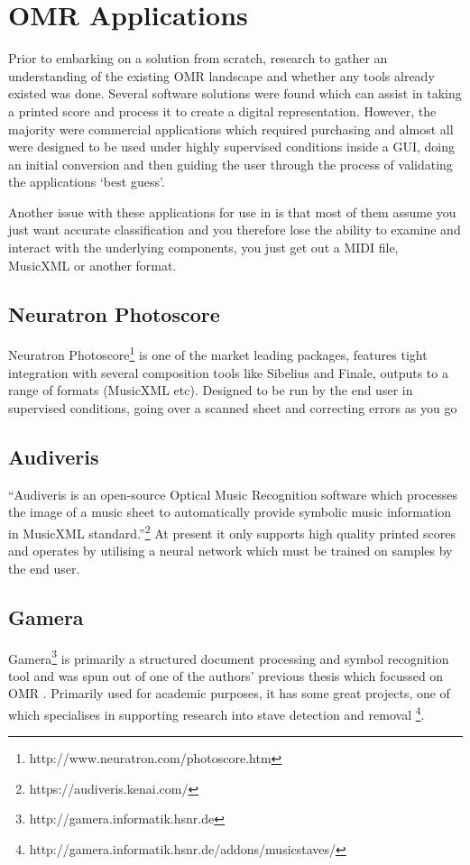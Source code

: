 \section{OMR Applications}

Prior to embarking on a solution from scratch, research to gather an understanding of the existing OMR landscape and whether any tools already existed was done. Several software solutions were found which can assist in taking a printed score and process it to create a digital representation. However, the majority were commercial applications which required purchasing and almost all were designed to be used under highly supervised conditions inside a \acrfull{GUI}, doing an initial conversion and then guiding the user through the process of validating the applications `best guess'.

Another issue with these applications for use in \noteED is that most of them assume you just want accurate classification and you therefore lose the ability to examine and interact with the underlying components, you just get out a MIDI file, MusicXML or another format.

\subsection{Neuratron Photoscore}
Neuratron Photoscore\footnote{http://www.neuratron.com/photoscore.htm} is one of the market leading packages, features tight integration with several composition tools like Sibelius and Finale, outputs to a range of formats (MusicXML etc). Designed to be run by the end user in supervised conditions, going over a scanned sheet and correcting errors as you go

\subsection{Audiveris}
``Audiveris is an open-source Optical Music Recognition software which processes the image of a music sheet to automatically provide symbolic music information in MusicXML standard.''\footnote{https://audiveris.kenai.com/}
\newline
At present it only supports high quality printed scores and operates by utilising a neural network which must be trained on samples by the end user.

\subsection{Gamera}
Gamera\footnote{http://gamera.informatik.hsnr.de} is primarily a structured document processing and symbol recognition tool \parencite{macmillan2002gamera} and was spun out of one of the authors' previous thesis which focussed on OMR \parencite{fujinaga1996adaptive}. Primarily used for academic purposes, it has some great projects, one of which specialises in supporting research into stave detection and removal \footnote{http://gamera.informatik.hsnr.de/addons/musicstaves/}.

